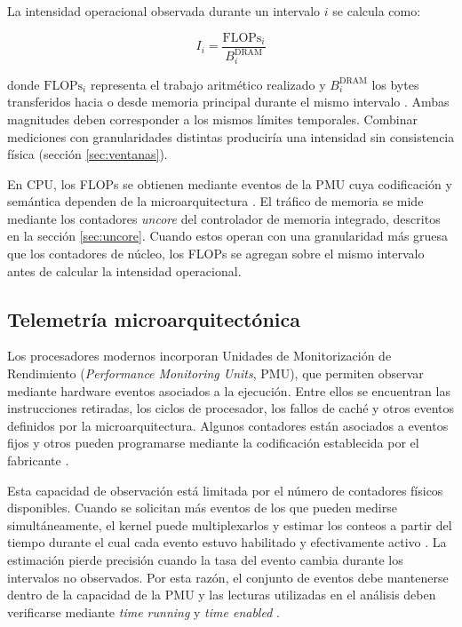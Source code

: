 La intensidad operacional observada durante un intervalo $i$ se calcula como:

\begin{equation}
I_i =
\frac{\text{FLOPs}_i}{B_i^{\text{DRAM}}}
\label{eq:intensidad}
\end{equation}

donde $\text{FLOPs}_i$ representa el trabajo aritmético realizado y
$B_i^{\text{DRAM}}$ los bytes transferidos hacia o desde memoria principal
durante el mismo intervalo \cite{Williams2009}. Ambas magnitudes deben
corresponder a los mismos límites temporales. Combinar mediciones con
granularidades distintas produciría una intensidad sin consistencia física
(sección \ref{sec:ventanas}).

En CPU, los FLOPs se obtienen mediante eventos de la PMU cuya codificación y
semántica dependen de la microarquitectura \cite{Weaver2008}. El tráfico de
memoria se mide mediante los contadores \textit{uncore} del controlador de
memoria integrado, descritos en la sección \ref{sec:uncore}. Cuando estos
operan con una granularidad más gruesa que los contadores de núcleo, los FLOPs
se agregan sobre el mismo intervalo antes de calcular la intensidad
operacional.

\subsection{Telemetría microarquitectónica}
\label{sec:marco-telemetria}

Los procesadores modernos incorporan Unidades de Monitorización de Rendimiento
(\textit{Performance Monitoring Units}, PMU), que permiten observar mediante
hardware eventos asociados a la ejecución. Entre ellos se encuentran las
instrucciones retiradas, los ciclos de procesador, los fallos de caché y otros
eventos definidos por la microarquitectura. Algunos contadores están asociados
a eventos fijos y otros pueden programarse mediante la codificación establecida
por el fabricante \cite{IntelSDM2026}.

Esta capacidad de observación está limitada por el número de contadores físicos
disponibles. Cuando se solicitan más eventos de los que pueden medirse
simultáneamente, el kernel puede multiplexarlos y estimar los conteos a partir
del tiempo durante el cual cada evento estuvo habilitado y efectivamente activo
\cite{Liu2024}. La estimación pierde precisión cuando la tasa del evento cambia
durante los intervalos no observados. Por esta razón, el conjunto de eventos
debe mantenerse dentro de la capacidad de la PMU y las lecturas utilizadas en
el análisis deben verificarse mediante \textit{time running} y
\textit{time enabled} \cite{Liu2024,LinuxPerfEventOpen2026}.

